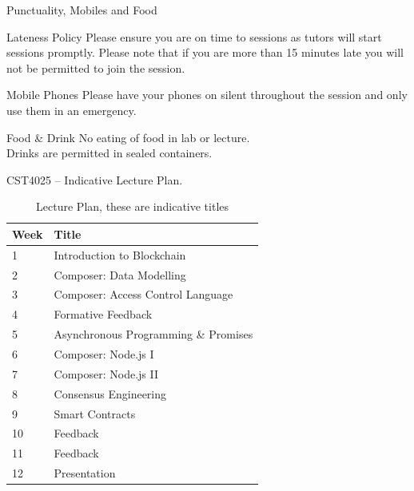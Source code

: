 \documentclass[pdf,table]{beamer}
\begin{document}
\begin{frame}{Punctuality, Mobiles and Food}
	\begin{block}{Lateness Policy}
	Please ensure you are on time to sessions as tutors will start sessions promptly.  Please note that if you are more than 15 minutes late you will not be permitted to join the session. 
	\end{block}
	\begin{block}{Mobile Phones}
 Please have your phones on silent throughout the session and only use them in an emergency.
	\end{block}
	\begin{block}{Food \& Drink}
		No eating of food in lab or lecture. \\
		Drinks are permitted in sealed containers. 
	\end{block}
\end{frame}



\begin{frame}{CST4025 \--- Indicative Lecture Plan.}
\begin{table}[tbh!]
\begin{tabular}{ l l}
	Week & Title \\ \hline
	 1 & Introduction to Blockchain\\
	 2 & Composer: Data Modelling\\
	 3 & Composer: Access Control Language\\
	 4 & Formative Feedback \\
	 5 & Asynchronous Programming \& Promises \\ 
	 6 & Composer: Node.js I \\  
	 7 & Composer: Node.js II\\ 
	 8 & Consensus Engineering\\
	 9 & Smart Contracts\\
	 10 & Feedback\\
	 11 & Feedback\\
	 12 &  Presentation\\
 \end{tabular}
	\caption{Lecture Plan, these are indicative titles} 
\end{table}
\end{frame}
\end{document}
